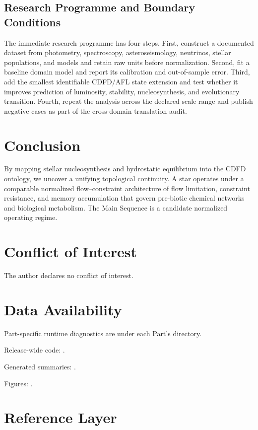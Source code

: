 \documentclass[11pt,a4paper]{article}
\begin{document}
\subsection{Research Programme and Boundary Conditions}

The immediate research programme has four steps. First, construct a documented
dataset from photometry, spectroscopy, asteroseismology, neutrinos, stellar populations, and models and retain raw units before normalization.
Second, fit a baseline domain model and report its calibration and out-of-sample
error. Third, add the smallest identifiable CDFD/AFL state extension and test
whether it improves prediction of luminosity, stability, nucleosynthesis, and evolutionary transition. Fourth, repeat the
analysis across the declared scale range and publish negative cases as part of
the cross-domain translation audit.


\section{Conclusion}
By mapping stellar nucleosynthesis and hydrostatic equilibrium into the CDFD ontology, we uncover a unifying topological continuity. A star operates under a comparable normalized flow--constraint architecture of flow limitation, constraint resistance, and memory accumulation that govern pre-biotic chemical networks and biological metabolism. The Main Sequence is a candidate normalized operating regime.

\section*{Conflict of Interest} The author declares no conflict of interest.
\section*{Data Availability}
Part-specific runtime diagnostics are under each Part's  directory.

Release-wide code: .

Generated summaries: .

Figures: .


\section{Reference Layer}


\end{document}

